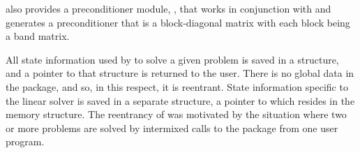 {\ida} also provides a preconditioner module, {\idabbdpre}, that works
in conjunction with {\nvecp} and generates a preconditioner that is a
block-diagonal matrix with each block being a band matrix.

All state information used by {\ida} to solve a given problem is saved
in a structure, and a pointer to that structure is returned to the
user.  There is no global data in the {\ida} package, and so, in this
respect, it is reentrant. State information specific to the linear
solver is saved in a separate structure, a pointer to which resides in
the {\ida} memory structure. The reentrancy of {\ida} was motivated
by the situation where two or more problems are solved by
intermixed calls to the package from one user program.

